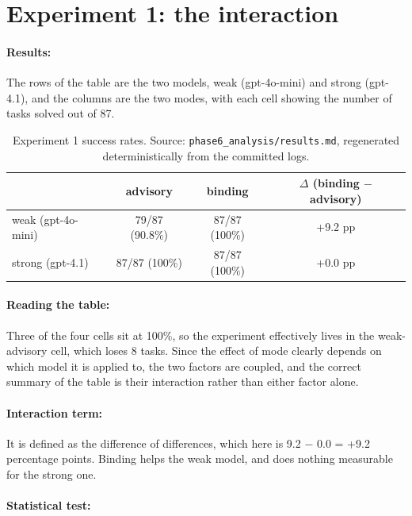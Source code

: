 \section{Experiment 1: the interaction}

\paragraph{Results:} The rows of the table are the two models, weak (gpt-4o-mini) and strong (gpt-4.1), and the columns are the two modes, with each cell showing the number of tasks solved out of 87.

\begin{table}[h]
\centering
\begin{tabular}{lccc}
\toprule
 & advisory & binding & $\Delta$ (binding $-$ advisory)\\
\midrule
weak (gpt-4o-mini) & 79/87 (90.8\%) & 87/87 (100\%) & +9.2 pp\\
strong (gpt-4.1) & 87/87 (100\%) & 87/87 (100\%) & +0.0 pp\\
\bottomrule
\end{tabular}
\caption{Experiment 1 success rates. Source: \texttt{phase6\_analysis/results.md}, regenerated deterministically from the committed logs.}
\label{tab:exp1}
\end{table}

\paragraph{Reading the table:} Three of the four cells sit at 100\%, so the experiment effectively lives in the weak-advisory cell, which loses 8 tasks. Since the effect of mode clearly depends on which model it is applied to, the two factors are coupled, and the correct summary of the table is their interaction rather than either factor alone.

\paragraph{Interaction term:} It is defined as the difference of differences, which here is 9.2 $-$ 0.0 = +9.2 percentage points. Binding helps the weak model, and does nothing measurable for the strong one.

\paragraph{Statistical test:}

